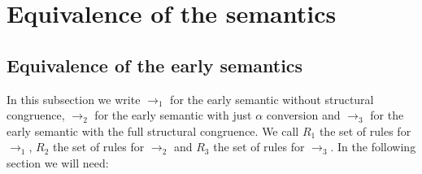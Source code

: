 \section{Equivalence of the semantics}
\subsection{Equivalence of the early semantics}
In this subsection we write $\rightarrow_{1}$ for the early semantic without structural congruence, $\rightarrow_{2}$ for the early semantic with just $\alpha$ conversion and $\rightarrow_{3}$ for the early semantic with the full structural congruence. We call $R_{1}$ the set of rules for $\rightarrow_{1}$, $R_{2}$ the set of rules for $\rightarrow_{2}$ and $R_{3}$ the set of rules for $\rightarrow_{3}$. 
In the following section we will need:
% 
